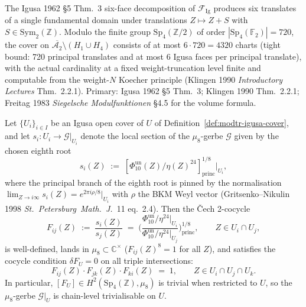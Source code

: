 \begin{remark}
\label{rem:modtr-igusa-cover-cardinality}
The Igusa 1962 \S5 Thm.~3 six-face decomposition of
$\mathcal F_{\mathrm{Ig}}$ produces six translates of a single
fundamental domain under translations
$Z\mapsto Z + S$ with $S\in\mathrm{Sym}_2(\mathbb Z)$. Modulo the
finite group $\mathrm{Sp}_4(\mathbb Z/2)$ of order
$|\mathrm{Sp}_4(\mathbb F_2)| = 720$, the cover on
$\overline{\mathcal A_2}\setminus(H_1\cup H_4)$ consists of at most
$6\cdot 720 = 4320$ charts (tight bound: 720 principal translates and
at most 6 Igusa faces per principal translate), with the actual
cardinality at a fixed weight-truncation level finite and
computable from the weight-$N$ Koecher principle (Klingen 1990
\emph{Introductory Lectures} Thm.~2.2.1). Primary: Igusa 1962 \S5
Thm.~3; Klingen 1990 Thm.~2.2.1; Freitag 1983
\emph{Siegelsche Modulfunktionen} \S4.5 for the volume formula.
\end{remark}

\begin{theorem}
\label{thm:modtr-banding-cocycle}
Let $\{U_i\}_{i\in I}$ be an Igusa open cover of $U$ of
Definition~\ref{def:modtr-igusa-cover}, and let
$s_i\colon U_i\to\mathcal G|_{U_i}$ denote the local section of the
$\mu_8$-gerbe $\mathcal G$ given by the chosen eighth root
\[
 s_i(Z) \;:=\; [\Phi_{10}^{\mathrm{un}}(Z)/\eta(Z)^{24}]^{1/8}_{\mathrm{princ}}|_{U_i},
\]
where the principal branch of the eighth root is pinned by the
normalisation
$\lim_{Z\to i\infty}s_i(Z) = e^{2\pi i\rho/8}|_{U_i}$ with $\rho$ the
BKM Weyl vector (Gritsenko--Nikulin 1998
\emph{St.~Petersburg~Math.~J.}~11 eq.~2.4). Then the \v{C}ech
2-cocycle
\[
 \boxed{\;
 F_{ij}(Z) \;:=\;
 \frac{s_i(Z)}{s_j(Z)}
 \;=\;
 \biggl(\frac{\Phi_{10}^{\mathrm{un}}/\eta^{24}|_{U_i}}
 {\Phi_{10}^{\mathrm{un}}/\eta^{24}|_{U_j}}\biggr)^{1/8}_{\mathrm{princ}},
 \qquad Z\in U_i\cap U_j,
 \;}
\]
is well-defined, lands in $\mu_8\subset\mathbb C^\times$
($F_{ij}(Z)^8 = 1$ for all $Z$), and satisfies the cocycle condition
$\delta F_U = 0$ on all triple intersections:
\[
 F_{ij}(Z)\cdot F_{jk}(Z)\cdot F_{ki}(Z) \;=\; 1,
 \qquad Z\in U_i\cap U_j\cap U_k.
\]
In particular, $[F_U]\in H^2(\mathrm{Sp}_4(\mathbb Z), \mu_8)$ is
trivial when restricted to $U$, so the $\mu_8$-gerbe $\mathcal G|_U$ is
chain-level trivialisable on $U$.
\end{theorem}

